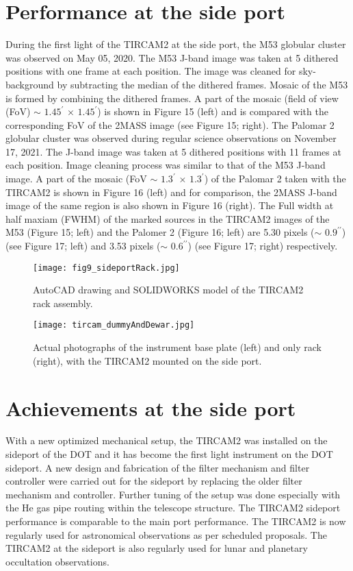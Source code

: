 \documentclass{jaa}
\begin{document}
\section{Performance at the side port}
During the first light of the TIRCAM2 at the side port, the M53 globular cluster was observed on May 05, 2020. The M53 J-band image was taken at 5 dithered positions with one frame at each position. The image was cleaned for sky-background by subtracting the median of the dithered frames. Mosaic of the M53 is formed by combining the dithered frames. A part of the mosaic (field of view (FoV) $\sim$ $1.45^{\prime}$ $\times$ $1.45^{\prime}$) is shown in Figure 15 (left) and is compared with the corresponding FoV of the 2MASS image (see Figure 15; right). The Palomar 2 globular cluster was observed during regular science observations on November 17, 2021. The J-band image was taken at 5 dithered positions with 11 frames at each position. Image cleaning process was similar to that of the M53 J-band image. A part of the mosaic (FoV $\sim$ $1.3^{\prime}$ $\times$ $1.3^{\prime}$) of the Palomar 2 taken with the TIRCAM2 is shown in Figure 16 (left) and for comparison, the 2MASS J-band image of the same region is also shown in Figure 16 (right). The Full width at half maxiam (FWHM) of the marked sources in the TIRCAM2 images of the M53 (Figure 15; left) and the Palomer 2 (Figure 16; left) are 5.30 pixels ($\sim$ $0.9^{\prime \prime}$) (see Figure 17; left) and 3.53 pixels ($\sim$ $0.6^{\prime \prime}$) (see Figure 17; right) respectively.

\begin{figure}[!h]
\texttt{[image: fig9\_sideportRack.jpg]}
\caption{AutoCAD drawing and SOLIDWORKS model of the TIRCAM2 rack assembly.}\label{fig9}
\end{figure}

\begin{figure}[!h]
\texttt{[image: tircam\_dummyAndDewar.jpg]}
\caption{Actual photographs of the instrument base plate (left) and only rack (right), with the TIRCAM2 mounted on the side port.}
\label{fig10}
\end{figure}

\section{Achievements at the side port}
With a new optimized mechanical setup, the TIRCAM2 was installed on the sideport of the DOT and it has become the first light instrument on the DOT sideport. A new design and fabrication of the filter mechanism and filter controller were carried out for the sideport by replacing the older filter mechanism and controller. Further tuning of the setup was done especially with the He gas pipe routing within the telescope structure. The TIRCAM2 sideport performance is comparable to the main port performance. The TIRCAM2 is now regularly used for astronomical observations as per scheduled proposals. The TIRCAM2 at the sideport is also regularly used for lunar and planetary occultation observations.
\end{document}
